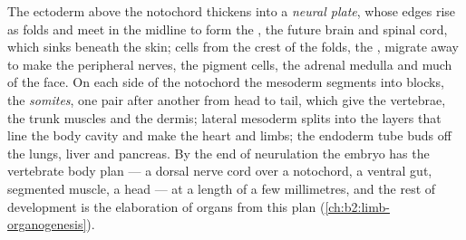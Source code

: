 \begin{proposition}\label{prop:b2:vertebrate-development:neurulation}
The ectoderm above the notochord thickens into a \emph{neural
plate}, whose edges rise as folds and meet in the midline to form
the \emph{}, the future brain and spinal cord, which
sinks beneath the skin; cells from the crest of the folds, the
\emph{}, migrate away to make the peripheral nerves,
the pigment cells, the adrenal medulla and much of the face. On
each side of the notochord the mesoderm segments into blocks, the
\emph{somites}, one pair after another from head to tail, which give
the vertebrae, the trunk muscles and the dermis; lateral mesoderm
splits into the layers that line the body cavity and make the heart
and limbs; the endoderm tube buds off the lungs, liver and pancreas.
By the end of neurulation the embryo has the vertebrate body plan
--- a dorsal nerve cord over a notochord, a ventral gut, segmented
muscle, a head --- at a length of a few millimetres, and the rest
of development is the elaboration of organs from this plan
(\cref{ch:b2:limb-organogenesis}).
\end{proposition}

